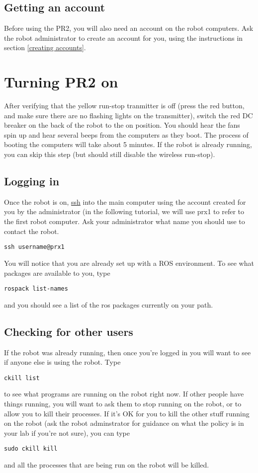 \subsection{Getting an account}
Before using the PR2, you will also need an account on the robot computers.  Ask the robot administrator to create an account for you, using the instructions in section \ref{creating accounts}.
\section{Turning PR2 on}
After verifying that the yellow run-stop tranmitter is off (press the red button, and make sure there are no flashing lights on the transmitter), switch the red DC breaker on the back of the robot to the on position.  You should hear the fans spin up and hear several beeps from the computers as they boot.  The process of booting the computers will take about 5 minutes.  If the robot is already running, you can skip this step (but should still disable the wireless run-stop).
\subsection{Logging in}
Once the robot is on, \href{http://unixhelp.ed.ac.uk/CGI/man-cgi?ssh}{ssh} into the main computer using the account created for you by the administrator (in the following tutorial, we will use prx1 to refer to the first robot computer.  Ask your administrator what name you should use to contact the robot.
\begin{verbatim}
ssh username@prx1
\end{verbatim}
You will notice that you are already set up with a ROS environment.  To see what packages are available to you, type
\begin{verbatim}
rospack list-names
\end{verbatim}
and you should see a list of the ros packages currently on your path.

\subsection{Checking for other users}
If the robot was already running, then once you're logged in you will want to see if anyone else is using the robot.  Type
\begin{verbatim}
ckill list
\end{verbatim}
to see what programs are running on the robot right now.  If other people have things running, you will want to ask them to stop running on the robot, or to allow you to kill their processes.  If it's OK for you to kill the other stuff running on the robot (ask the robot adminstrator for guidance on what the policy is in your lab if you're not sure), you can type
\begin{verbatim}
sudo ckill kill
\end{verbatim}
and all the processes that are being run on the robot will be killed.
